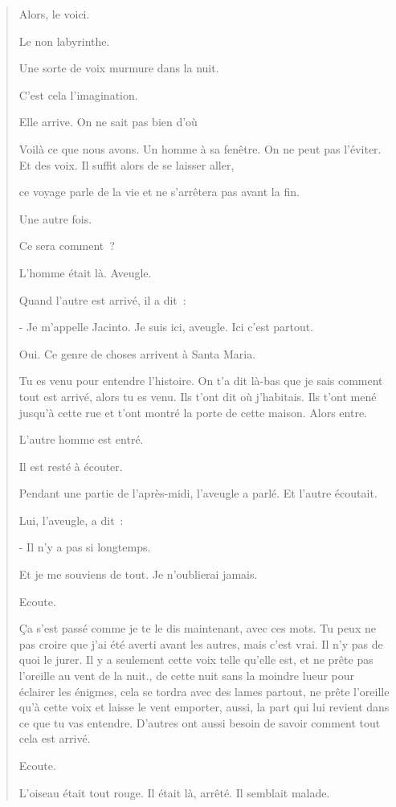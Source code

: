 \begin{quote}
Alors, le voici.

Le non labyrinthe.

Une sorte de voix murmure dans la nuit.

C'est cela l'imagination.

Elle arrive. On ne sait pas bien d'où

Voilà ce que nous avons. Un homme à sa fenêtre. On ne peut pas l'éviter.
Et des voix. Il suffit alors de se laisser aller,

ce voyage parle de la vie et ne s'arrêtera pas avant la fin.

Une autre fois.

Ce sera comment~?

L'homme était là. Aveugle.

Quand l'autre est arrivé, il a dit~:

- Je m'appelle Jacinto. Je suis ici, aveugle. Ici c'est partout.

Oui. Ce genre de choses arrivent à Santa Maria.

Tu es venu pour entendre l'histoire. On t'a dit là-bas que je sais
comment tout est arrivé, alors tu es venu. Ils t'ont dit où j'habitais.
Ils t'ont mené jusqu'à cette rue et t'ont montré la porte de cette
maison. Alors entre.

L'autre homme est entré.

Il est resté à écouter.

Pendant une partie de l'après-midi, l'aveugle a parlé. Et l'autre
écoutait.

Lui, l'aveugle, a dit~:

- Il n'y a pas si longtemps.

Et je me souviens de tout. Je n'oublierai jamais.

Ecoute.

Ça s'est passé comme je te le dis maintenant, avec ces mots. Tu peux ne
pas croire que j'ai été averti avant les autres, mais c'est vrai. Il n'y
pas de quoi le jurer. Il y a seulement cette voix telle qu'elle est, et
ne prête pas l'oreille au vent de la nuit., de cette nuit sans la
moindre lueur pour éclairer les énigmes, cela se tordra avec des lames
partout, ne prête l'oreille qu'à cette voix et laisse le vent emporter,
aussi, la part qui lui revient dans ce que tu vas entendre. D'autres ont
aussi besoin de savoir comment tout cela est arrivé.

Ecoute.

L'oiseau était tout rouge. Il était là, arrêté. Il semblait malade.


\end{quote}
